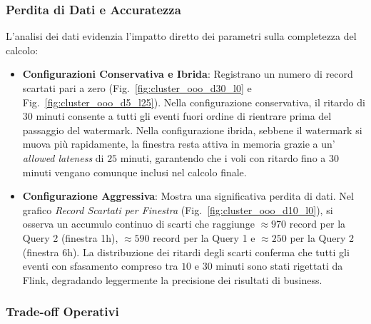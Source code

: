 \documentclass[conference]{IEEEtran}
\begin{document}
\subsubsection{Perdita di Dati e Accuratezza}\label{subsubsec:data_loss}

L'analisi dei dati evidenzia l'impatto diretto dei parametri sulla completezza del calcolo:
\begin{itemize}
    \item \textbf{Configurazioni Conservativa e Ibrida}: Registrano un numero di record scartati pari a zero (Fig.~\ref{fig:cluster_ooo_d30_l0} e Fig.~\ref{fig:cluster_ooo_d5_l25}). Nella configurazione conservativa, il ritardo di $30$ minuti consente a tutti gli eventi fuori ordine di rientrare prima del passaggio del watermark. Nella configurazione ibrida, sebbene il watermark si muova più rapidamente, la finestra resta attiva in memoria grazie a un' \textit{allowed lateness} di $25$ minuti, garantendo che i voli con ritardo fino a $30$ minuti vengano comunque inclusi nel calcolo finale.
    \item \textbf{Configurazione Aggressiva}: Mostra una significativa perdita di dati. Nel grafico \textit{Record Scartati per Finestra} (Fig.~\ref{fig:cluster_ooo_d10_l0}), si osserva un accumulo continuo di scarti che raggiunge $\approx 970$ record per la Query 2 (finestra 1h), $\approx 590$ record per la Query 1 e $\approx 250$ per la Query 2 (finestra 6h). La distribuzione dei ritardi degli scarti conferma che tutti gli eventi con sfasamento compreso tra $10$ e $30$ minuti sono stati rigettati da Flink, degradando leggermente la precisione dei risultati di business.
\end{itemize}

\subsubsection{Trade-off Operativi}\label{subsubsec:latency_tradeoffs}
\end{document}
